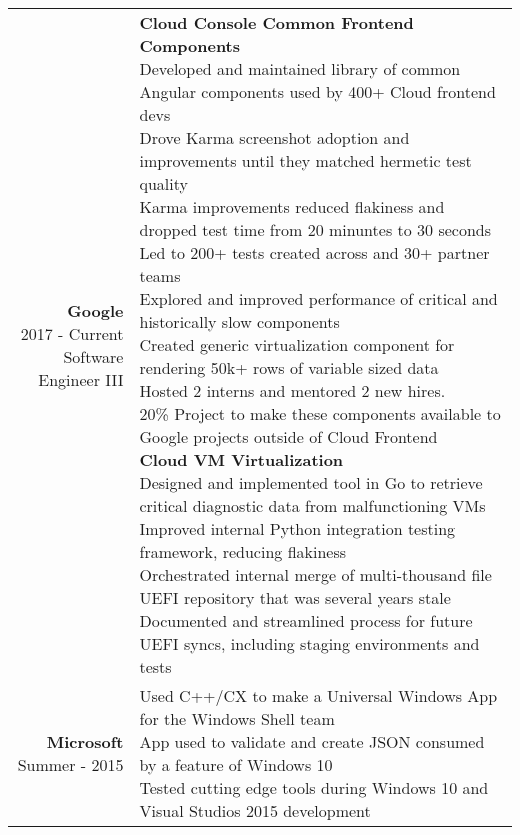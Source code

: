 \documentclass{article}
\makeatletter
\newcommand*\lineBr[2][c]{\begin{tabular}[#1]{@{}r@{}}#2\end{tabular}}
\newcommand*\lineBl[2][c]{\begin{tabular}[#1]{@{}l@{}}#2\end{tabular}}
\makeatother
\begin{document}
\begin{tabularx}{\textwidth}{ r | X }
  \vspace{4mm}
	\lineBr{ {\large {\bf Google }\\[2mm]2017 - Current\\[2mm]Software Engineer III}} &
  \lineBl{
		{\bf Cloud Console Common Frontend Components}\\
		Developed and maintained library of common Angular components used by 400+ Cloud frontend devs \\[2mm]
		Drove Karma screenshot adoption and improvements until they matched hermetic test quality \\[2mm]
		Karma improvements reduced flakiness and dropped test time from 20 minuntes to 30 seconds \\[2mm]
		Led to 200+ tests created across and 30+ partner teams \\[2mm]
		Explored and improved performance of critical and historically slow components \\[2mm]
		Created generic virtualization component for rendering 50k+ rows of variable sized data \\[2mm]
		Hosted 2 interns and mentored 2 new hires. \\[2mm]
		20\% Project to make these components available to Google projects outside of Cloud Frontend \\[2mm]
		{\bf Cloud VM Virtualization}\\
		Designed and implemented tool in Go to retrieve critical diagnostic data from malfunctioning VMs \\[2mm]
		Improved internal Python integration testing framework, reducing flakiness \\[2mm]
		Orchestrated internal merge of multi-thousand file UEFI repository that was several years stale \\[2mm]
		Documented and streamlined process for future UEFI syncs, including staging environments and tests \\[2mm]
  } \\
  \vspace{4mm}
  \lineBr{ {\large {\bf Microsoft }\\[2mm]Summer - 2015}} &
  \lineBl{
    Used C++/CX to make a Universal Windows App for the Windows Shell team \\[2mm] 
    App used to validate and create JSON consumed by a feature of Windows 10 \\[2mm]
    Tested cutting edge tools during Windows 10 and Visual Studios 2015 development 
}
\end{tabularx}
\end{document}
